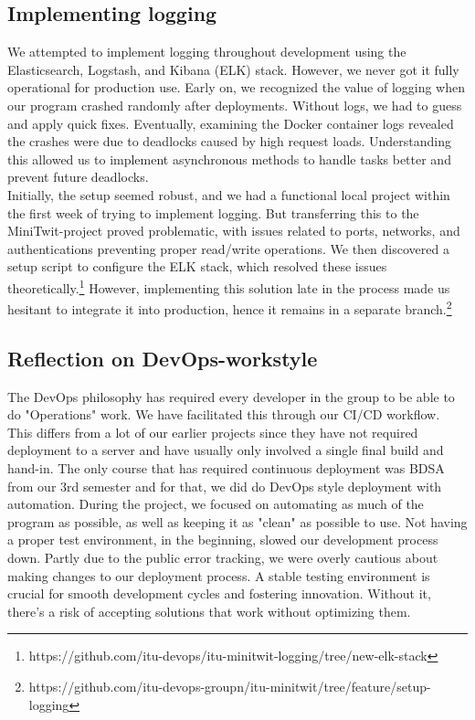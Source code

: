 \subsection{Implementing logging} \label{lessons:logging}
We attempted to implement logging throughout development using the Elasticsearch, Logstash, and Kibana (ELK) stack. However, we never got it fully operational for production use. Early on, we recognized the value of logging when our program crashed randomly after deployments. Without logs, we had to guess and apply quick fixes. Eventually, examining the Docker container logs revealed the crashes were due to deadlocks caused by high request loads. Understanding this allowed us to implement asynchronous methods to handle tasks better and prevent future deadlocks. \\

Initially, the setup seemed robust, and we had a functional local project within the first week of trying to implement logging. But transferring this to the MiniTwit-project proved problematic, with issues related to ports, networks, and authentications preventing proper read/write operations. We then discovered a setup script to configure the ELK stack, which resolved these issues theoretically.\footnote{https://github.com/itu-devops/itu-minitwit-logging/tree/new-elk-stack\cite{elk}} However, implementing this solution late in the process made us hesitant to integrate it into production, hence it remains in a separate branch.\footnote{https://github.com/itu-devops-groupn/itu-minitwit/tree/feature/setup-logging}

\subsection{Reflection on DevOps-workstyle}
The DevOps philosophy has required every developer in the group to be able to do "Operations" work. We have facilitated this through our CI/CD workflow. This differs from a lot of our earlier projects since they have not required deployment to a server and have usually only involved a single final build and hand-in. The only course that has required continuous deployment was BDSA from our 3rd semester and for that, we did do DevOps style deployment with automation. During the project, we focused on automating as much of the program as possible, as well as keeping it as "clean" as possible to use. Not having a proper test environment, in the beginning, slowed our development process down. Partly due to the public error tracking, we were overly cautious about making changes to our deployment process. A stable testing environment is crucial for smooth development cycles and fostering innovation. Without it, there's a risk of accepting solutions that work without optimizing them. \\

\label{lastpage}